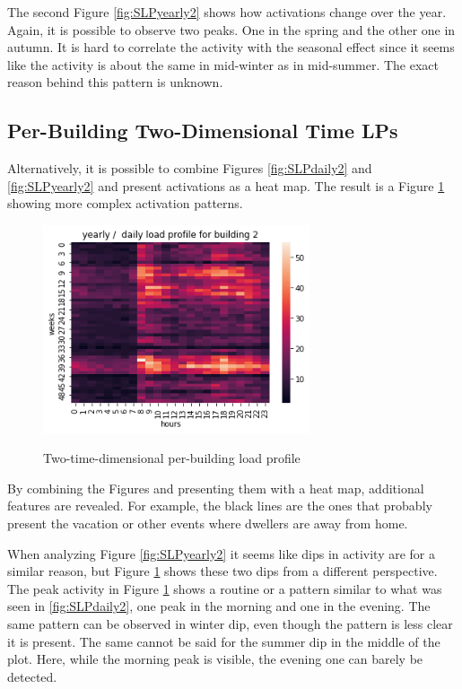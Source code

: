 The second Figure \ref{fig:SLPyearly2} shows how activations change over the year.  
Again, it is possible to observe two peaks.
One in the spring and the other one in autumn. 
It is hard to correlate the activity with the seasonal effect since it seems like the activity is about the same in mid-winter as in mid-summer. 
The exact reason behind this pattern is unknown.

\subsection{Per-Building Two-Dimensional Time LPs}
\label{ssec:per_building_two_time_dim}
Alternatively, it is possible to combine Figures \ref{fig:SLPdaily2} and \ref{fig:SLPyearly2} and present activations as a heat map.
The result is a Figure \ref{fig:SLPHMyearly2} showing more complex activation patterns.

\begin{figure}[H]
	\centering
	\caption{Two-time-dimensional per-building load profile}
	\includegraphics[width=0.7\textwidth]{../Figures/LPS/SLPHMyearly2.png}
	\label{fig:SLPHMyearly2}
\end{figure}

By combining the Figures and presenting them with a heat map, additional features are revealed.
For example, the black lines are the ones that probably present the vacation or other events where dwellers are away from home.

When analyzing Figure \ref{fig:SLPyearly2} it seems like dips in activity are for a similar reason, but Figure \ref{fig:SLPHMyearly2} shows these two dips from a different perspective.
The peak activity in Figure \ref{fig:SLPHMyearly2} shows a routine or a pattern similar to what was seen in \ref{fig:SLPdaily2}, one peak in the morning and one in the evening. 
The same pattern can be observed in winter dip, even though the pattern is less clear it is present.
The same cannot be said for the summer dip in the middle of the plot. 
Here, while the morning peak is visible, the evening one can barely be detected.

